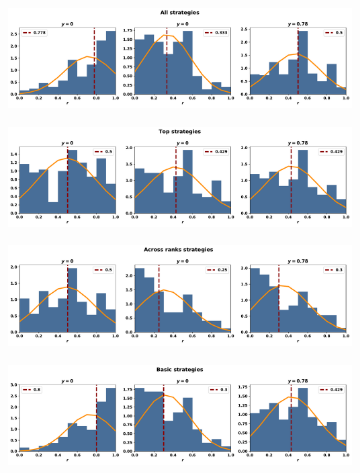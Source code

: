\begin{figure}[!htbp]
    \begin{subfigure}{\textwidth}
    \includegraphics[width=\textwidth]{src/chapters/07/img/normalised_rank_classification_all_strategies.pdf}
    \end{subfigure}
    \par\bigskip
    \begin{subfigure}{\textwidth}
    \includegraphics[width=\textwidth]{src/chapters/07/img/normalised_rank_classification_top_strategies.pdf}
    \end{subfigure}
    \par\bigskip
    \begin{subfigure}{\textwidth}
    \includegraphics[width=\textwidth]{src/chapters/07/img/normalised_rank_classification_across_ranks_strategies.pdf}
    \end{subfigure}
    \par\bigskip
    \begin{subfigure}{\textwidth}
    \includegraphics[width=\textwidth]{src/chapters/07/img/normalised_rank_classification_basic_strategies.pdf}
    \end{subfigure}
\end{figure}

